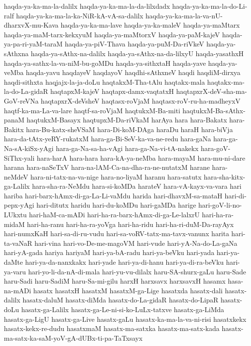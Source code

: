 {haqda-ya-ka-ma-la-dalilx
haqda-ya-ka-ma-la-da-lilxdadx
haqda-ya-ka-ma-la-do-Li-ralf
haqda-ya-ka-ma-la-ka-NiR-kA-vA-sa-dalilx
haqda-ya-ka-ma-la-va-nU-dharxvX-mu-Kava
haqda-ya-ka-ma-lave
haqda-ya-ka-maleV
haqda-ya-maMtarx
haqda-ya-maM-tarx-kekxyuM
haqda-ya-maMtorxV
haqda-ya-paM-kajeV
haqda-ya-pa-ri-yaM-taraM
haqda-ya-piV-Thava
haqda-ya-puM-Da-riVkeV
haqda-ya-sAthxna
haqda-ya-sAthx-na-dalilx
haqda-ya-sAthx-na-da-lilxyU
haqda-yasathxH
haqda-ya-sathx-la-va-niM-bu-goMDu
haqda-ya-sithxtaH
haqda-yave
haqda-ya-veMba
haqda-yavu
haqdayeV
haqdayoV
haqdhi-sAthxneV
haqdi
haqdiM-dirxya
haqdi-sithxta
haqjajx-la-ja-doLu
haqtakxM-Tha-tAlu
haqtakx-mala
haqtakx-ma-la-do-La-gidaR
haqtapxM-kajeV
haqtapx-damx-vaqtatxH
haqtapxrX-deV-sha-ma-GoV-reVNa
haqtapxrX-deVsheV
haqtasx-roVjaM
haqtasx-roV-ru-ha-madheyxV
haqtf-ka-ma-La-va-lare
haqtf-sa-roVjaM
haqtukxM-Ba-miti
haqtukxM-Ba-sAthx-panaM
haqtukxM-Basayx
haqtupxM-Da-riVkaM
harAya
hara
hara-Bakatx
hara-Bakitx
hara-Bu-katx-sheVSaM
hara-Di-koM-DAga
haraDu
haraH
hara-biVja
hara-da-tAtx-yeRY-rukatxM
hara-ga-Bi-SeV-ka-va-ne-redu
hara-gaNa
hara-ga-Na-sA-kiSx-yAgi
hara-ga-Na-sa-ha-vAgi
hara-ga-Na-vi-tA-nakekx
hara-goV-SiThx-yali
hara-harA
hara-hara
hara-kA-ya-neMba
hara-mayaM
hara-mu-ni-dare
harana
hara-naSeTxV
hara-na-lAM-Ca-na-dha-ra-ne-nutatxM
harane
hara-neMdeV
hara-ni-tatx-na-va-nige
hara-no-liyaM
haranu
hara-satutx
hara-sha-kitx-ga-Lalilx
hara-sha-ra-NeMdu
hara-si-koMDa
harateV
hara-vA-kayx-va-vara
hari
hariba
hari-barx-hAmx-di-ga-La-Li-vaMdu
harida
hari-dhavxM-sa-mataH
hari-di-pepx-yAgi
hari-ditutx
haridu
hari-du-koMDu
hari-gaMDa
harige
hari-goV-li-no-LUkxtu
hari-haM-ca-mADi
hari-ha-ra-barx-hAmx-di-ga-Le-lalxrU
hari-ha-ra-midaM
hari-ha-ranu
hari-ha-ra-yoVga
hari-ha-ridu
hari-ha-ri-duM-Da-rayAyx
hari-numxKaH
hari-sa-di-ru-vudu
hari-sa-voRV-tatx-ma-tavx-vanunx
harita
hari-ta-vaNaR
hari-vina
hari-vo-De-me-magoVM
hari-vude
hari-yA-Na-do-La-gaNa
hari-yA-gada
hariya
hariyaM
hari-ya-bA-radu
hari-ya-beVku
hari-yada
hari-ya-daMte
hari-ya-da-nanxkakx
hari-yade
hari-ya-di-hanu
hari-ya-di-ra-beVku
hari-ya-varu
hari-yo-li-da-nA-di-mala
hari-yu-vu-dilalx
haru-SA-shurx-gaLu
haru-Sade
haru-Sadi
haru-SadiM
haru-Sa-mi-gilu
harxH
harxsavx
harxsavxH
hasamx
hasa-na-mADi
hasatx
hasatxH
hasatxM
hasatxM-ga-Lige
hasatxda
hasatx-dali
hasatx-dalilx
hasatx-daluM
hasatx-diMda
hasatx-do-La-gidaR
hasatx-do-LipaR
hasatx-doLu
hasatx-ga-Lalilx
hasatx-ga-Le-ni-si-ko-LuLx-tatxve
hasatx-ga-LiMda
hasatx-ga-LigU
hasatx-ga-Live
hasatx-gaLu
hasatx-ka-ma-la-va-ni-risi
hasatxkekx
hasatx-kekx-re-dudu
hasatxmaM
hasatx-ma-satxka
hasatx-ma-satx-kada
hasatx-ma-satx-ka-saM-yoV-gA-dUBx-ti-pa-TaTxsayx
}
